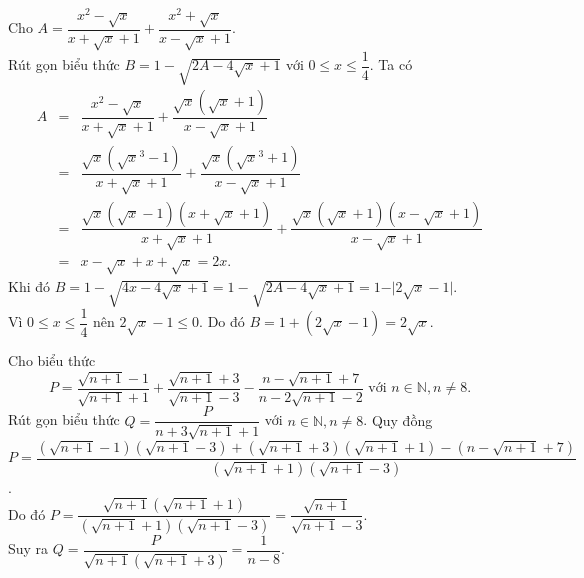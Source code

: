 \begin{bt}%
	Cho $A=\dfrac{x^{2}-\sqrt{x}}{x+\sqrt{x}+1}+\dfrac{x^{2}+\sqrt{x}}{x-\sqrt{x}+1}$.\\
	Rút gọn biểu thức $B=1-\sqrt{2A-4\sqrt{x}+1}$ với $0\leq x\leq \dfrac{1}{4}$.
	\loigiai
	{
		Ta có
		\allowdisplaybreaks
		\begin{eqnarray*}
			A &=& \dfrac{x^{2}-\sqrt{x}}{x+\sqrt{x}+1}+\dfrac{\sqrt{x}(\sqrt{x}+1)}{x-\sqrt{x}+1}\\
			&=& \dfrac{\sqrt{x}(\sqrt{x}^3-1)}{x+\sqrt{x}+1}+\dfrac{\sqrt{x}(\sqrt{x}^3+1)}{x-\sqrt{x}+1}\\
			&=& \dfrac{\sqrt{x}(\sqrt{x}-1)(x+\sqrt{x}+1)}{x+\sqrt{x}+1}+\dfrac{\sqrt{x}(\sqrt{x}+1)(x-\sqrt{x}+1)}{x-\sqrt{x}+1}\\
			&=& x-\sqrt{x}+x+\sqrt{x}=2x.
		\end{eqnarray*}
		Khi đó $B=1-\sqrt{4x-4\sqrt{x}+1}=1-\sqrt{2A-4\sqrt{x}+1}=1-\vert 2\sqrt{x}-1\vert$.\\
		Vì $0\leq x\leq \dfrac{1}{4}$ nên $2\sqrt{x}-1\leq 0$. Do đó $B=1+(2\sqrt{x}-1) =2\sqrt{x}$.
	}
\end{bt}

\begin{bt}%
	Cho biểu thức $$P=\dfrac{\sqrt{n+1}-1}{\sqrt{n+1}+1}+\dfrac{\sqrt{n+1}+3}{\sqrt{n+1}-3}-\dfrac{n-\sqrt{n+1}+7}{n-2\sqrt{n+1}-2} \text{ với } n \in \mathbb N,n \neq 8.$$ Rút gọn biểu thức $Q = \dfrac{P}{n + 3\sqrt{n+1} + 1}$ với $n \in \mathbb N,n \neq 8$.
	\loigiai
	{
		Quy đồng $P = \dfrac{(\sqrt{n+1}-1)(\sqrt{n+1}-3)+(\sqrt{n+1}+3)(\sqrt{n+1}+1)-(n-\sqrt{n+1}+7)}{(\sqrt{n+1}+1)(\sqrt{n+1}-3)}$.\\
		Do đó $P = \dfrac{\sqrt{n+1}(\sqrt{n+1}+1)}{(\sqrt{n+1}+1)(\sqrt{n+1}-3)} = \dfrac{\sqrt{n+1}}{\sqrt{n+1}-3}$.\\
		Suy ra $Q = \dfrac{P}{\sqrt{n+1}(\sqrt{n+1}+3)} = \dfrac{1}{n-8}$.
	}
\end{bt}

